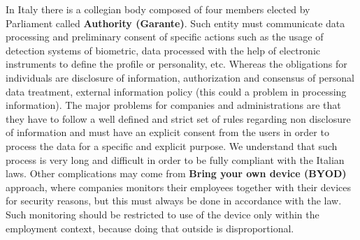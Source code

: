In Italy there is a collegian body composed of four members elected by Parliament called \textbf{Authority (Garante)}. Such entity must communicate data processing and preliminary consent of specific actions such as the usage of detection systems of biometric, data processed with the help of electronic instruments to define the profile or personality, etc. Whereas the obligations for individuals are disclosure of information, authorization and consensus of personal data treatment, external information policy (this could a problem in processing information). The major problems for companies and administrations are that they have to follow a well defined and strict set of rules regarding non disclosure of information and must have an explicit consent from the users in order to process the data for a specific and explicit purpose. We understand that such process is very long and difficult in order to be fully compliant with the Italian laws. Other complications may come from \textbf{Bring your own device (BYOD)} approach, where companies monitors their employees together with their devices for security reasons, but this must always be done in accordance with the law. Such monitoring should be restricted to use of the device only within the employment context, because doing that outside is disproportional.